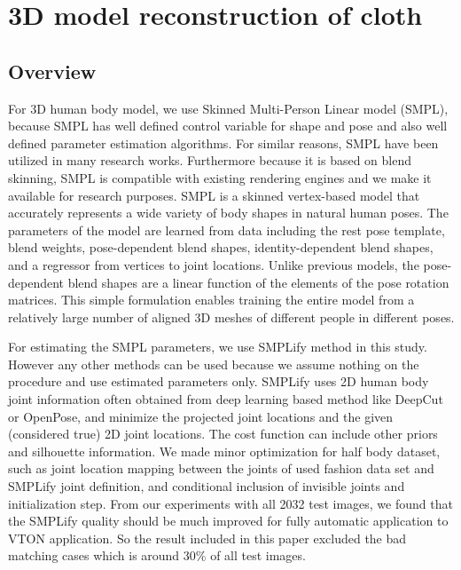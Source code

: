 \documentclass[runningheads]{llncs}
\begin{document}
\section{3D model reconstruction of cloth} \label{section:3dclothrecon}

\subsection{Overview} 

For 3D human body model, we use Skinned Multi-Person Linear model (SMPL)\cite{Loper2015SMPLAS}, because SMPL has well defined control variable for shape and pose and also well defined parameter estimation  algorithms. For similar reasons, SMPL have been utilized in many research works. Furthermore because it is based on blend skinning, SMPL is compatible with existing rendering engines and we make it available for research purposes. SMPL is a skinned vertex-based model that accurately represents a wide variety of body shapes in natural human poses. The parameters of the model are learned from data including the rest pose template, blend weights, pose-dependent blend shapes, identity-dependent blend shapes, and a regressor from vertices to joint locations. Unlike previous models, the pose-dependent blend shapes are a linear function of the elements of the pose rotation matrices. This simple formulation enables training the entire model from a relatively large number of aligned 3D meshes of different people in different poses. \cite{Loper2015SMPLAS} 


For estimating the SMPL parameters, we use SMPLify\cite{Bogo2016SMPLify} method in this study. However any other methods can be used because we assume nothing on the procedure and use estimated parameters only. SMPLify uses 2D human body joint information often obtained from deep learning based method like DeepCut or OpenPose, and minimize the projected joint locations and the given (considered true) 2D joint locations. The cost function can include other priors and silhouette information. We made minor optimization for half body dataset, such as joint location mapping between the joints of used fashion data set and SMPLify joint definition, and conditional inclusion of invisible joints and initialization step.  From our experiments with all 2032 test images, we found that the SMPLify quality should be much improved for fully automatic application to VTON application. So the result included in this paper excluded the bad matching cases which is around 30\% of all test images.    
  
\end{document}
